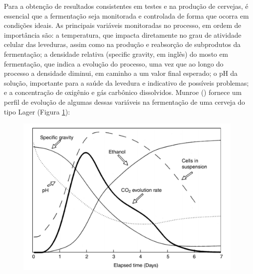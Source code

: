 Para a obtenção de resultados consistentes em testes e na produção de cervejas, é
essencial que a fermentação seja monitorada e controlada de forma que ocorra em
condições ideais. As principais variáveis monitoradas no processo, em ordem de
importância são: a temperatura, que impacta diretamente no grau de atividade
celular das leveduras, assim como na produção e reabsorção de subprodutos da
fermentação; a densidade relativa (specific gravity, em inglês) do mosto em
fermentação, que indica a evolução do processo, uma vez que ao longo do processo
a densidade diminui, em caminho a um valor final esperado; o pH da solução,
importante para a saúde da levedura e indicativo de possíveis problemas; e a
concentração de oxigênio e gás carbônico dissolvidos. Munroe () fornece um
perfil de evolução de algumas dessas variáveis na fermentação de uma cerveja do
tipo Lager (Figura \ref{fig:variaveis_fermentacao}):

\begin{figure}[H]
    \centering
    \includegraphics[scale=0.40]{figuras/contexto/variaveis_fermentacao.PNG}
    \label{fig:variaveis_fermentacao}
\end{figure}



